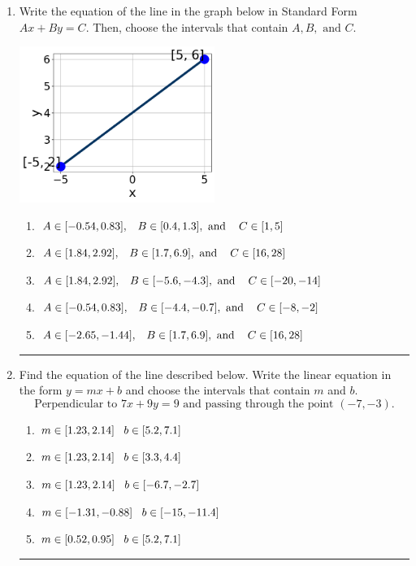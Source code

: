 \documentclass[14pt]{extbook}
\newcommand{\litem}[1]{\item#1\hspace*{-1cm}\rule{\textwidth}{0.4pt}}
\begin{document}
\begin{enumerate}
{\begin{enumerate}[label=\Alph*.]
\end{enumerate} }
\litem{
Write the equation of the line in the graph below in Standard Form $Ax+By=C$. Then, choose the intervals that contain $A, B, \text{ and } C$.
\begin{center}
    \includegraphics[width=0.5\textwidth]{../Figures/linearGraphToStandardCopyA.png}
\end{center}
\begin{enumerate}[label=\Alph*.]
\item \( A \in [-0.54, 0.83], \hspace{3mm} B \in [0.4, 1.3], \text{ and } \hspace{3mm} C \in [1, 5] \)
\item \( A \in [1.84, 2.92], \hspace{3mm} B \in [1.7, 6.9], \text{ and } \hspace{3mm} C \in [16, 28] \)
\item \( A \in [1.84, 2.92], \hspace{3mm} B \in [-5.6, -4.3], \text{ and } \hspace{3mm} C \in [-20, -14] \)
\item \( A \in [-0.54, 0.83], \hspace{3mm} B \in [-4.4, -0.7], \text{ and } \hspace{3mm} C \in [-8, -2] \)
\item \( A \in [-2.65, -1.44], \hspace{3mm} B \in [1.7, 6.9], \text{ and } \hspace{3mm} C \in [16, 28] \)

\end{enumerate} }
\litem{
Find the equation of the line described below. Write the linear equation in the form $ y=mx+b $ and choose the intervals that contain $m$ and $b$.\[ \text{Perpendicular to } 7 x + 9 y = 9 \text{ and passing through the point } (-7, -3). \]\begin{enumerate}[label=\Alph*.]
\item \( m \in [1.23, 2.14] \hspace*{3mm} b \in [5.2, 7.1] \)
\item \( m \in [1.23, 2.14] \hspace*{3mm} b \in [3.3, 4.4] \)
\item \( m \in [1.23, 2.14] \hspace*{3mm} b \in [-6.7, -2.7] \)
\item \( m \in [-1.31, -0.88] \hspace*{3mm} b \in [-15, -11.4] \)
\item \( m \in [0.52, 0.95] \hspace*{3mm} b \in [5.2, 7.1] \)


\end{enumerate}}
\end{enumerate}
\end{document}
